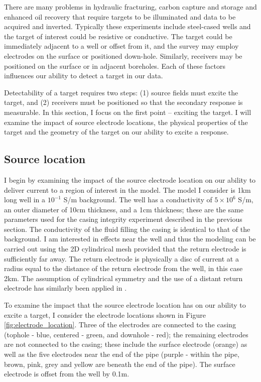 There are many problems in hydraulic fracturing, carbon capture and storage and enhanced oil recovery that require targets to be illuminated and data to be acquired and inverted. Typically these experiments include steel-cased wells and the target of interest could be resistive or conductive. The target could be immediately adjacent to a well or offset from it, and the survey may employ electrodes on the surface or positioned down-hole. Similarly, receivers may be positioned on the surface or in adjacent boreholes. Each of these factors influences our ability to detect a target in our data.

Detectability of a target requires two steps: (1) source fields must excite the target, and (2) receivers must be positioned so that the secondary response is measurable. In this section, I focus on the first point -- exciting the target. I will examine the impact of source electrode locations, the physical properties of the target and the geometry of the target on our ability to excite a response.
\subsection{Source location}
I begin by examining the impact of the source electrode location on our ability to deliver current to a region of interest in the model. The model I consider is 1km long well in a $10^{-1}$ S/m background. The well has a conductivity of $5 \times 10^6$ S/m, an outer diameter of 10cm thickness, and a 1cm thickness; these are the same parameters used for the casing integrity experiment described in the previous section. The conductivity of the fluid filling the casing is identical to that of the background. I am interested in effects near the well and thus the modeling can be carried out using the 2D cylindrical mesh provided that the return electrode is sufficiently far away. The return electrode is physically a disc of current at a radius equal to the distance of the return electrode from the well, in this case 2km. The assumption of cylindrical symmetry and the use of a distant return electrode has similarly been applied in \cite{Schenkel1991}.

To examine the impact that the source electrode location has on our ability to excite a target, I consider the electrode locations shown in Figure \ref{fig:electrode_location}. Three of the electrodes are connected to the casing (tophole - blue, centered - green, and downhole - red); the remaining electrodes are not connected to the casing; these include the surface electrode (orange) as well as the five electrodes near the end of the pipe (purple - within the pipe, brown, pink, grey and yellow are beneath the end of the pipe). The surface electrode is offset from the well by 0.1m.



